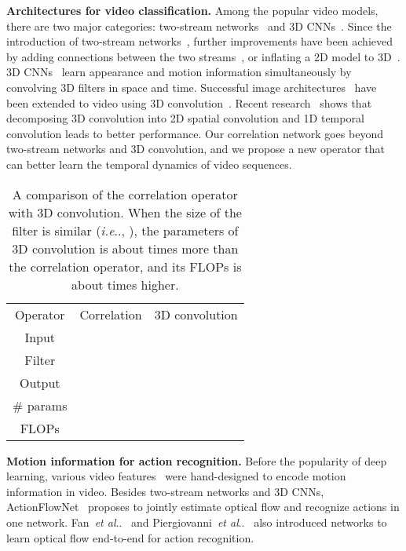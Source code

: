 \documentclass[10pt,twocolumn,letterpaper]{article}
\makeatletter
\DeclareRobustCommand\onedot{\futurelet\@let@token\@onedot}
\def\@onedot{\ifx\@let@token.\else.\null\fi\xspace}
\def\ie{\emph{i.e}\onedot} \def\Ie{\emph{I.e}\onedot}
\def\etal{\emph{et al}\onedot}
\makeatother
\begin{document}
\noindent\textbf{Architectures for video classification.} 
Among the popular video models, there are two major categories: two-stream networks~\cite{SimonyanZ14,wang2015towards,FeichtenhoferPZ16,WangXW0LTG16,qiu2019learning,crasto2019mars} and 3D CNNs~\cite{baccouche2011sequential,Ming2013,Tran15,linsuniccv15,tran2017closer,P3D,xie2017rethinking,diba2019dynamonet,feichtenhofer2020x3d}. 
Since the introduction of
two-stream networks~\cite{SimonyanZ14},
further improvements have been achieved by adding connections between the two streams~\cite{FeichtenhoferPZ16}, or inflating a 2D model to 3D~\cite{I3D}.
3D CNNs~\cite{baccouche2011sequential,Ming2013,Tran15} learn appearance and motion information simultaneously by convolving 3D filters in space and time. Successful image architectures~\cite{SimonyanZ14a,Szegedy15,KaimingHe16} have been extended to video using 3D convolution~\cite{I3D,Tran15,xie2017rethinking}. 
Recent research~\cite{linsuniccv15,tran2017closer,P3D,qiu2019learning} shows that decomposing 3D convolution into 2D spatial convolution and 1D temporal convolution leads to better performance.
Our correlation network goes beyond two-stream networks and 3D convolution, and we propose a new operator that can better learn the temporal dynamics of video sequences.

\begin{table*}[t]
\centering
\begin{tabular}{c|c|c} \hline
	Operator & Correlation & 3D convolution  \\ \shline 
	Input &   &  \\ \hline 
	Filter &   &   \\ \hline
	Output &  &    \\ \hline 
	\# params &  &  \\ \hline
	FLOPs &  &  \\ \hline
\end{tabular}
\caption{A comparison of the correlation operator with 3D convolution. When the size  of the filter is similar (\ie, ), the parameters of 3D convolution is about  times more than the correlation operator, and its FLOPs is about  times higher.} 
\label{tab:corr_vs_3d}
\end{table*}

\noindent\textbf{Motion information for action recognition.} 
Before the popularity of deep learning, various video features~\cite{Laptev03,Scovanner07,KMS08,Piotr05,Wang2013} were hand-designed to encode motion information in video.
Besides two-stream networks and 3D CNNs, ActionFlowNet~\cite{ng2018actionflownet} proposes to jointly estimate optical flow and recognize actions in one network. 
Fan~\etal~\cite{fan2018end} and Piergiovanni~\etal~\cite{piergiovanni2018representation} also introduced networks to learn optical flow end-to-end for action recognition. 
\end{document}
